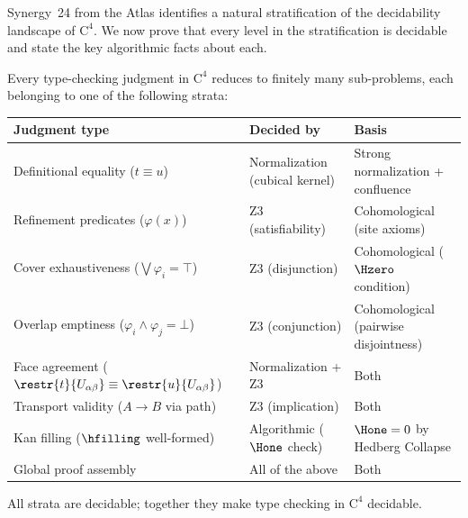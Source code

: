 Synergy~24 from the Atlas identifies a natural stratification of the
decidability landscape of $\mathrm{C}^4$.  We now prove that every
level in the stratification is decidable and state the key algorithmic
facts about each.

\begin{theorem}
\label{thm:decidability-stratification}
Every type-checking judgment in $\mathrm{C}^4$ reduces to finitely many
sub-problems, each belonging to one of the following strata:

\begin{center}
\renewcommand{\arraystretch}{1.4}
\begin{tabular}{p{4.5cm}p{3.5cm}p{4.5cm}}
\toprule
\textbf{Judgment type} & \textbf{Decided by} & \textbf{Basis} \\
\midrule
Definitional equality ($t \equiv u$) &
  Normalization (cubical kernel) &
  Strong normalization + confluence \\
Refinement predicates ($\varphi(x)$) &
  Z3 (satisfiability) &
  Cohomological (site axioms) \\
Cover exhaustiveness ($\bigvee \varphi_i = \top$) &
  Z3 (disjunction) &
  Cohomological ($\Hzero$ condition) \\
Overlap emptiness ($\varphi_i \wedge \varphi_j = \bot$) &
  Z3 (conjunction) &
  Cohomological (pairwise disjointness) \\
Face agreement ($\restr{t}{U_{\alpha\beta}} \equiv \restr{u}{U_{\alpha\beta}}$) &
  Normalization + Z3 &
  Both \\
Transport validity ($A \to B$ via path) &
  Z3 (implication) &
  Both \\
Kan filling ($\hfilling$ well-formed) &
  Algorithmic ($\Hone$ check) &
  $\Hone = 0$ by Hedberg Collapse \\
Global proof assembly &
  All of the above &
  Both \\
\bottomrule
\end{tabular}
\end{center}

\noindent All strata are decidable; together they make type checking in
$\mathrm{C}^4$ decidable.
\end{theorem}

